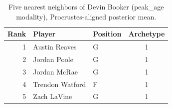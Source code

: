 \begin{table}[htbp]
  \centering\small
  \begin{tabular}{rllc}
    \toprule
    Rank & Player & Position & Archetype \\
    \midrule
    1 & Austin Reaves & G & 1 \\
    2 & Jordan Poole & G & 1 \\
    3 & Jordan McRae & G & 1 \\
    4 & Trendon Watford & F & 1 \\
    5 & Zach LaVine & G & 1 \\
    \bottomrule
  \end{tabular}
  \caption{Five nearest neighbors of Devin Booker (peak_age modality), Procrustes-aligned posterior mean.}
  \label{tab:Devin_Booker_neighbors_peak_age}
\end{table}

